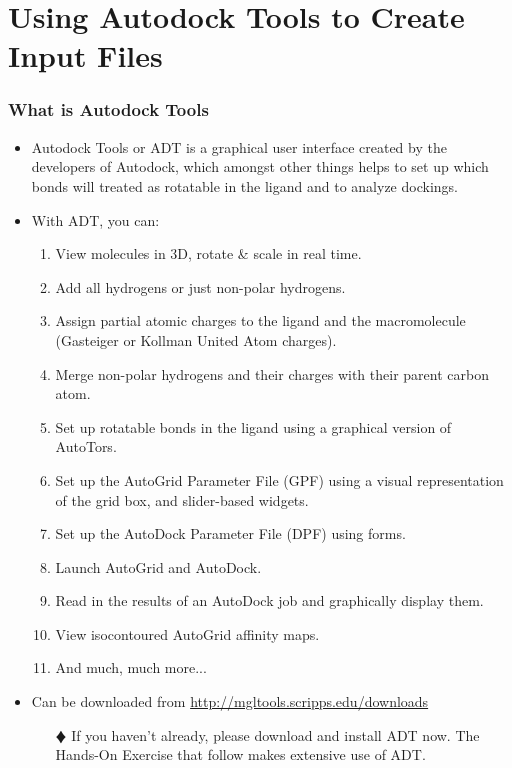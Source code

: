 \documentclass[slidestop,mathserif,compress,xcolor=svgnames]{beamer}
\begin{document}
\section{Using Autodock Tools to Create Input Files}
\begin{frame}
  \frametitle{\small What is Autodock Tools}
  \begin{block}{}
    \begin{itemize}
      \item Autodock Tools or ADT is a graphical user interface created by the developers of Autodock, which amongst other things helps to set up which bonds will treated as rotatable in the ligand and to analyze dockings.
      \item With ADT, you can:
      \begin{enumerate}
        \item View molecules in 3D, rotate \& scale in real time.
        \item Add all hydrogens or just non-polar hydrogens.
        \item Assign partial atomic charges to the ligand and the macromolecule (Gasteiger or Kollman United Atom charges).
        \item Merge non-polar hydrogens and their charges with their parent carbon atom.
        \item Set up rotatable bonds in the ligand using a graphical version of AutoTors.
        \item Set up the AutoGrid Parameter File (GPF) using a visual representation of the grid box, and slider-based widgets.
        \item Set up the AutoDock Parameter File (DPF) using forms.
        \item Launch AutoGrid and AutoDock.
        \item Read in the results of an AutoDock job and graphically display them.
        \item View isocontoured AutoGrid affinity maps.
        \item And much, much more...
      \end{enumerate}
      \item Can be downloaded from \url{http://mgltools.scripps.edu/downloads}
      \begin{enumerate}
        \item[$\vardiamond$] If you haven't already, please download and install ADT now. The Hands-On Exercise that follow makes extensive use of ADT.
      \end{enumerate}
    \end{itemize}
  \end{block}
\end{frame}
\end{document}
